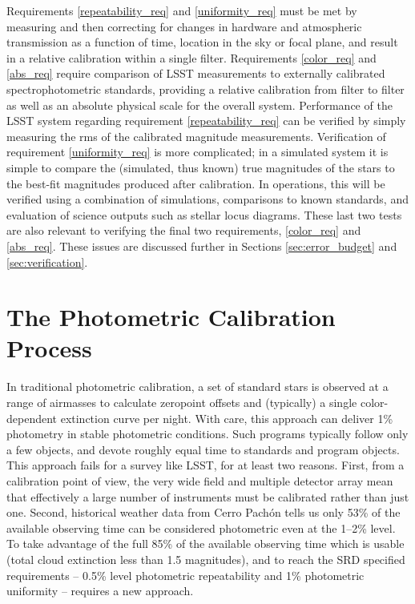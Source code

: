 \documentclass[12pt,preprint]{aastex}
\begin{document}
Requirements \ref{repeatability_req} and \ref{uniformity_req} must be
met by measuring and then correcting for changes in hardware and
atmospheric transmission as a function of time, location in the sky or
focal plane, and result in a relative calibration within a single
filter. Requirements \ref{color_req} and \ref{abs_req} require
comparison of LSST measurements to externally calibrated
spectrophotometric standards, providing a relative calibration from
filter to filter as well as an absolute physical scale for the overall
system.  Performance of the LSST system regarding requirement
\ref{repeatability_req} can be verified by simply measuring the rms of
the calibrated magnitude measurements. Verification of requirement
\ref{uniformity_req} is more complicated; in a simulated system it is
simple to compare the (simulated, thus known) true magnitudes of the
stars to the best-fit magnitudes produced after calibration. 
In operations, this will be verified using a combination of simulations,
comparisons to known standards, and evaluation of science outputs such
as stellar locus diagrams. These last two tests are also relevant to
verifying the final two requirements, \ref{color_req} and
\ref{abs_req}.  These issues are discussed further in Sections 
\ref{sec:error_budget} and \ref{sec:verification}.


\section{The Photometric Calibration Process}
\label{sec:calib_overview}

In traditional photometric calibration, a set of standard stars is
observed at a range of airmasses to calculate zeropoint offsets and
(typically) a single color-dependent extinction curve per night. With care,
this approach can deliver 1\% photometry in stable photometric conditions.
Such programs typically follow only a few objects, and devote roughly equal
time to standards and program objects.   This approach fails for a survey like
LSST, for at least two reasons.  First, from a calibration point of view, 
the very wide field and multiple detector array mean that effectively a large number of instruments must be
calibrated rather than just one.
Second, historical weather data from Cerro Pach\'{o}n tells us
only 53\% of the available observing time can be considered
photometric even at the 1--2\% level. To take advantage of the full
85\% of the available observing time which is usable (total cloud
extinction less than 1.5 magnitudes), and to reach the SRD specified
requirements -- 0.5\% level photometric repeatability and 1\%
photometric uniformity -- requires a new approach.
\end{document}
